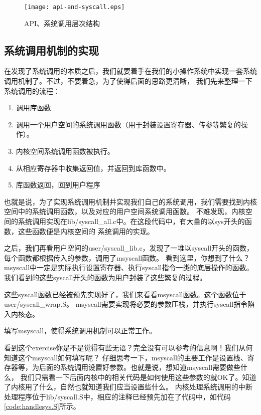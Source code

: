 \begin{figure}[htbp]
  \centering
  \texttt{[image: api-and-syscall.eps]}
  \caption{API、系统调用层次结构}\label{fig:api-and-syscall} 
\end{figure}

\subsection{系统调用机制的实现}
在发现了系统调用的本质之后，我们就要着手在我们的小操作系统中实现一套系统调用机制了。不过，不要着急，为了使得后面的思路更清晰，
我们先来整理一下系统调用的流程：
\begin{enumerate}
  \item 调用库函数
  \item 调用一个用户空间的系统调用函数（用于封装设置寄存器、传参等繁复的操作）。
  \item 内核空间系统调用函数被执行。
  \item 从相应寄存器中收集返回值，并返回到库函数中。
  \item 库函数返回，回到用户程序
\end{enumerate}

也就是说，为了实现系统调用机制并实现我们自己的系统调用，我们需要找到内核空间中的系统调用函数，以及对应的用户空间系统调用函数。
不难发现，内核空间的系统调用实现在lib/syscall\_all.c中。在这段代码中，有大量的以sys开头的函数，这些函数便是内核空间的
系统调用的实现。

之后，我们再看用户空间的user/syscall\_lib.c，发现了一堆以syscall开头的函数，每个函数都根据传入的参数，调用了msyscall函数。
看到这里，你想到了什么？msyscall中一定是实际执行设置寄存器、执行syscall指令一类的底层操作的函数。
我们看到的这些syscall开头的函数为用户封装了这些繁复的过程。

这些syscall函数已经被预先实现好了，我们来看看msyscall函数。这个函数位于user/syscall\_wrap.S。
msyscall需要实现将必要的参数压栈，并执行syscall指令陷入内核态。

\begin{exercise}
填写msyscall，使得系统调用机制可以正常工作。
\end{exercise}

看到这个exercise你是不是觉得有些无语？完全没有可以参考的信息啊！我们从何知道这个msyscall如何填写呢？
仔细思考一下，msyscall的主要工作是设置栈、寄存器等，为后面的系统调用设置好参数。也就是说，想知道msyscall需要做些什么，
我们只需看一下后面内核中的相关代码是如何使用这些参数的就OK了。知道了内核用了什么，自然也就知道我们应当设置些什么。
内核处理系统调用的中断处理程序位于lib/syscall.S中，相应的注释已经预先加在了代码中，如代码\ref{code:handlesys.S}所示。

